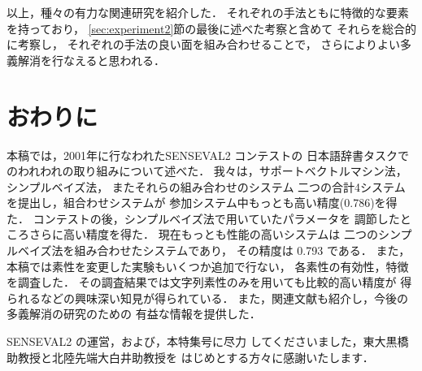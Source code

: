 以上，種々の有力な関連研究を紹介した．
それぞれの手法ともに特徴的な要素を持っており，
\ref{sec:experiment2}節の最後に述べた考察と含めて
それらを総合的に考察し，
それぞれの手法の良い面を組み合わせることで，
さらによりよい多義解消を行なえると思われる．

\section{おわりに}

本稿では，2001年に行なわれたSENSEVAL2 コンテストの
日本語辞書タスクでのわれわれの取り組みについて述べた．
我々は，サポートベクトルマシン法，シンプルベイズ法，
またそれらの組み合わせのシステム
二つの合計4システムを提出し，組合わせシステムが
参加システム中もっとも高い精度(0.786)を得た．
コンテストの後，シンプルベイズ法で用いていたパラメータを
調節したところさらに高い精度を得た．
現在もっとも性能の高いシステムは
二つのシンプルベイズ法を組み合わせたシステムであり，
その精度は 0.793 である．
また，本稿では素性を変更した実験もいくつか追加で行ない，
各素性の有効性，特徴を調査した．
その調査結果では文字列素性のみを用いても比較的高い精度が
得られるなどの興味深い知見が得られている．
また，関連文献も紹介し，今後の多義解消の研究のための
有益な情報を提供した．

\acknowledgment

SENSEVAL2 の運営，および，本特集号に尽力
してくださいました，東大黒橋助教授と北陸先端大白井助教授を
はじめとする方々に感謝いたします．



